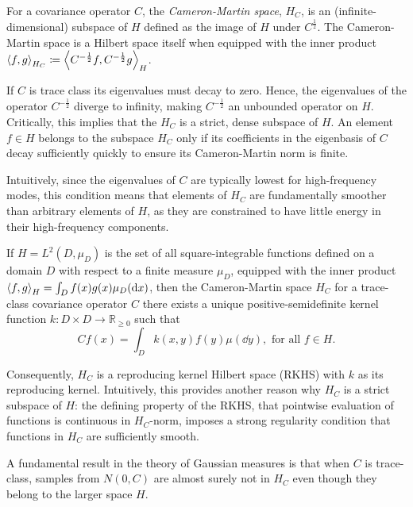 For a covariance operator \(C\), the \textit{Cameron-Martin space}, \(H_{C}\), is an (infinite-dimensional) subspace of \(H\) defined as the image of \(H\) under \(C^{\frac{1}{2}}\). The Cameron-Martin space is a Hilbert space itself when equipped with the inner product \(\ev{f, g}_{H_{C}} \coloneqq \ev{C^{-\frac{1}{2}}f, C^{-\frac{1}{2}}g}_{H}\).

If \(C\) is trace class its eigenvalues must decay to zero. Hence, the eigenvalues of the operator \(C^{-\frac{1}{2}}\) diverge to infinity, making \(C^{-\frac{1}{2}}\) an unbounded operator on \(H\). Critically, this implies that the \(H_{C}\) is a strict, dense subspace of \(H\). An element \(f \in H\) belongs to the subspace \(H_{C}\) only if its coefficients in the eigenbasis of \(C\) decay sufficiently quickly to ensure its Cameron-Martin norm is finite.

Intuitively, since the eigenvalues of \(C\) are typically lowest for high-frequency modes, this condition means that elements of \(H_{C}\) are fundamentally smoother than arbitrary elements of \(H\), as they are constrained to have little energy in their high-frequency components.

If \(H = L^{2}(D, \mu_{D})\) is the set of all square-integrable functions defined on a domain \(D\) with respect to a finite measure \(\mu_{D}\), equipped with the inner product \(\ev{f, g}_{H} = \int_{D} f(x) g(x) \mu_{D}(\dd{x})\), then the Cameron-Martin space \(H_{C}\) for a trace-class covariance operator \(C\) there exists a unique positive-semidefinite kernel function \(k: D \times D \to \mathbb{R}_{\geq 0}\) such that
\[
  Cf(x) = \int_{D} k(x, y)f(y) \mu(\dd{y}), \text{ for all } f \in H.
\]

Consequently, \(H_{C}\) is a reproducing kernel Hilbert space (RKHS) with \(k\) as its reproducing kernel. Intuitively, this provides another reason why \(H_{C}\) is a strict subspace of \(H\): the defining property of the RKHS, that pointwise evaluation of functions is continuous in \(H_{C}\)-norm, imposes a strong regularity condition that functions in \(H_{C}\) are sufficiently smooth.

A fundamental result in the theory of Gaussian measures is that when \(C\) is trace-class, samples from \(N(0, C)\) are almost surely not in \(H_{C}\) even though they belong to the larger space \(H\). %



